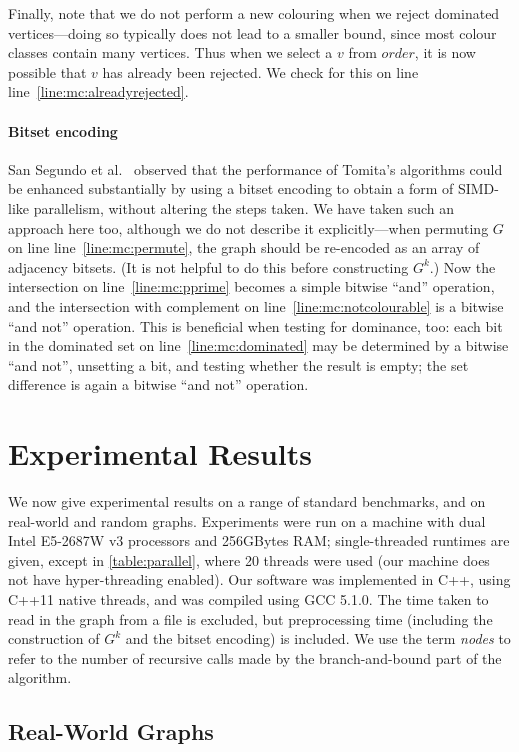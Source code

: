 \documentclass[letterpaper]{article}
\newcommand{\mcline}[1]{line~\ref{line:mc:#1}}
\newcommand{\order}{\mathit{order}}
\begin{document}
Finally, note that we do not perform a new colouring when we reject dominated vertices---doing so
typically does not lead to a smaller bound, since most colour classes contain many vertices. Thus
when we select a $v$ from $\order$, it is now possible that $v$ has already been rejected. We check
for this on line \mcline{alreadyrejected}.

\paragraph{Bitset encoding} San Segundo et al.\  observed
that the performance of Tomita's algorithms could be enhanced substantially by using a bitset
encoding to obtain a form of SIMD-like parallelism, without altering the steps taken. We have taken
such an approach here too, although we do not describe it explicitly---when permuting $G$ on line
\mcline{permute}, the graph should be re-encoded as an array of adjacency bitsets. (It is not
helpful to do this before constructing $G^k$.) Now the intersection on \mcline{pprime} becomes a
simple bitwise ``and'' operation, and the intersection with complement on \mcline{notcolourable} is
a bitwise ``and not'' operation. This is beneficial when testing for dominance, too: each bit in the
dominated set on \mcline{dominated} may be determined by a bitwise ``and not'', unsetting a bit, and
testing whether the result is empty; the set difference is again a bitwise ``and not'' operation.

\section{Experimental Results}

We now give experimental results on a range of standard benchmarks, and on real-world and random
graphs. Experiments were run on a machine with dual Intel E5-2687W v3 processors and 256GBytes
RAM; single-threaded runtimes are given, except in \cref{table:parallel}, where 20 threads were used
(our machine does not have hyper-threading enabled). Our software was implemented in C++, using
C++11 native threads, and was compiled using GCC 5.1.0. The time taken to read in the graph from a
file is excluded, but preprocessing time (including the construction of $G^k$ and the bitset
encoding) is included. We use the term \emph{nodes} to refer to the number of recursive calls made
by the branch-and-bound part of the algorithm.

\subsection{Real-World Graphs}
\end{document}
